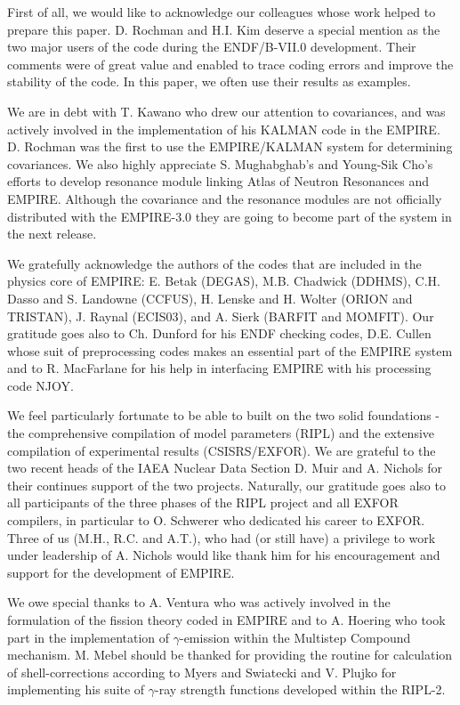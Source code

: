 First of all, we would like to acknowledge our colleagues whose work helped
to prepare this paper. D. Rochman and H.I. Kim deserve a special mention as
the two major users of the code during the ENDF/B-VII.0 development. Their
comments were of great value and enabled to trace coding errors and improve
the stability of the code. In this paper, we often use their results as
examples.

We are in debt with T. Kawano who drew our attention to covariances, and was
actively involved in the implementation of his KALMAN code in the EMPIRE. D.
Rochman was the first to use the EMPIRE/KALMAN system for determining
covariances. We also highly appreciate S. Mughabghab's and Young-Sik Cho's
efforts to develop resonance module linking Atlas of Neutron Resonances and
EMPIRE. Although the covariance and the resonance modules are not officially
distributed with the EMPIRE-3.0 they are going to become part of the system
in the next release.

We gratefully acknowledge the authors of the codes that are included in the
physics core of EMPIRE: E. Betak (DEGAS), M.B. Chadwick (DDHMS), C.H. Dasso
and S. Landowne (CCFUS), H. Lenske and H. Wolter (ORION and TRISTAN), J.
Raynal (ECIS03), and A. Sierk (BARFIT and MOMFIT). Our gratitude goes also
to Ch. Dunford for his ENDF checking codes, D.E. Cullen whose suit of
preprocessing codes makes an essential part of the EMPIRE system and to R.
MacFarlane for his help in interfacing EMPIRE with his processing code NJOY.

We feel particularly fortunate to be able to built on the two solid
foundations - the comprehensive compilation of model parameters (RIPL) and
the extensive compilation of experimental results (CSISRS/EXFOR).
We are grateful to the two recent heads
of the IAEA Nuclear Data Section D. Muir and A. Nichols for their continues
support of the two projects. Naturally, our gratitude goes also to all
participants of the three phases of the RIPL project and all EXFOR
compilers, in particular to O. Schwerer who dedicated his career to EXFOR.
Three of us (M.H., R.C. and A.T.), who had (or still have) a privilege to
work under leadership of A. Nichols would like thank him for his
encouragement and support for the development of EMPIRE.

We owe special thanks to A. Ventura who was actively involved in the
formulation of the fission theory coded in EMPIRE and to A. Hoering who took
part in the implementation of $\gamma$-emission within the Multistep
Compound mechanism. M. Mebel should be thanked for providing the routine for
calculation of shell-corrections according to Myers and Swiatecki and V.
Plujko for implementing his suite of $\gamma$-ray strength functions
developed within the RIPL-2.

